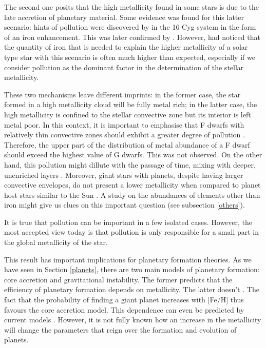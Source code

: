 \documentclass[dvips,12pt,a4paper]{report}
\begin{document}
The second one posits that the high metallicity found in some stars is due to the late accretion of planetary material. Some evidence was found for this latter scenario: hints of pollution were discovered by \citet{Gonzalez-1998} in the 16 Cyg system in the form of an iron enhancement. This was later confirmed by \citet{Laws-2001}. However, \citet{Santos-2001b} had noticed that the quantity of iron that is needed to explain the higher metallicity of a solar type star with this scenario is often much higher than expected, especially if we consider pollution as the dominant factor in the determination of the stellar metallicity.

These two mechanisms leave different imprints: in the former case, the star formed in a high metallicity cloud will be fully metal rich; in the latter case, the high metallicity is confined to the stellar convective zone but its interior is left metal poor. In this context, it is important to emphasise that F dwarfs with relatively thin convective zones should exhibit a greater degree of pollution \citep{Fischer-2005}. Therefore, the upper part of the distribution of metal abundance of a F dwarf should exceed the highest value of G dwarfs. This was not observed. On the other hand, this pollution might dillute with the passage of time, mixing with deeper, unenriched layers \citep{Vauclair-2004}. Moreover, giant stars with planets, despite having larger convective envelopes, do not present a lower metallicity when compared to planet host stars similar to the Sun \citep{Ecuvillon-2006b}. A study on the abundances of elements other than iron might give us clues on this important question (see subsection \ref{others}).

It is true that pollution can be important in a few isolated cases. However, the most accepted view today is that pollution is only responsible for a small part in the global metallicity of the star.

This result has important implications for planetary formation theories. As we have seen in Section \ref {planets}, there are two main models of planetary formation: core accretion and gravitational instability. The former predicts that the efficiency of planetary formation depends on metallicity. The latter doesn't \citep{Boss-2002}. The fact that the probability of finding a giant planet increases with [Fe/H] thus favours the core accretion model. This dependence can even be predicted by current models \citep{Ida-2004a}. However, it is not fully known how an increase in the metallicity will change the parameters that reign over the formation and evolution of planets.
\end{document}
